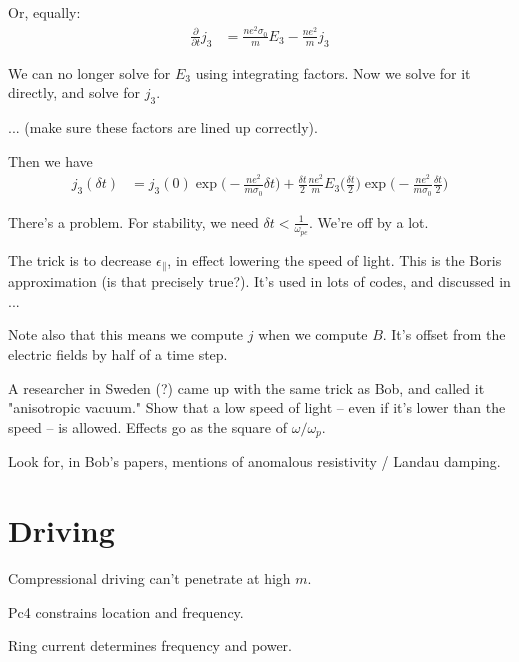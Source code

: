 Or, equally: 
\begin{align}
  \frac{\partial}{\partial t} j_3 & = 
  \frac{n e^2 \sigma_0}{m} E_3 - 
  \frac{n e^2}{m} j_3
\end{align}

We can no longer solve for $E_3$ using integrating factors. Now we solve for it directly, and solve for $j_3$. 

... (make sure these factors are lined up correctly). 

Then we have 
\begin{align}
  j_3(\delta t) & = 
  j_3(0) \exp \big( -\frac{n e^2}{m \sigma_0} \delta t \big) +  
  \frac{\delta t}{2} \frac{n e^2}{m} E_3 
    \big( \frac{\delta t}{2} \big) \exp \big( -\frac{n e^2}{m \sigma_0} \frac{\delta t}{2} \big)
\end{align}

There's a problem. For stability, we need $\delta t < \frac{1}{ \omega_{p e} }$. We're off by a lot. 

The trick is to decrease $\epsilon_\parallel$, in effect lowering the speed of light. This is the Boris approximation (is that precisely true?). It's used in lots of codes, and discussed in ...

Note also that this means we compute $j$ when we compute $B$. It's offset from the electric fields by half of a time step. 

A researcher in Sweden (?) came up with the same trick as Bob, and called it "anisotropic vacuum." Show that a low speed of light -- even if it's lower than the \Alfven speed -- is allowed. Effects go as the square of $\omega/\omega_p$. 

Look for, in Bob's papers, mentions of anomalous resistivity / Landau damping. 

\section{Driving}

Compressional driving can't penetrate at high $m$. 

Pc4 constrains location and frequency. 

Ring current determines frequency and power. 

